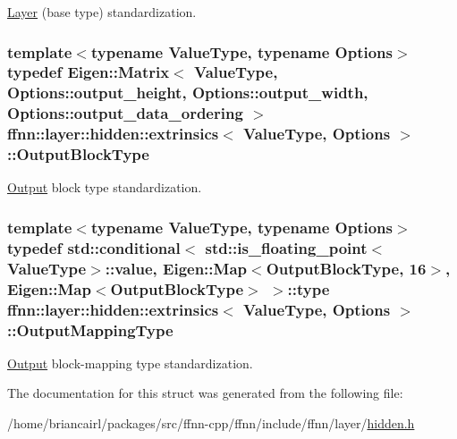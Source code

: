 \hyperlink{classffnn_1_1layer_1_1_layer}{Layer} (base type) standardization. 

\hypertarget{structffnn_1_1layer_1_1hidden_1_1extrinsics_ac5ca721e2e5843ddcf90351b59c4e56e}{
\subsubsection[{Output\-Block\-Type}]{\setlength{\rightskip}{0pt plus 5cm}template$<$typename Value\-Type, typename Options$>$ typedef Eigen\-::\-Matrix$<$ Value\-Type, Options\-::output\-\_\-height, Options\-::output\-\_\-width, Options\-::output\-\_\-data\-\_\-ordering $>$ {\bf ffnn\-::layer\-::hidden\-::extrinsics}$<$ Value\-Type, Options $>$\-::{\bf Output\-Block\-Type}}}\label{structffnn_1_1layer_1_1hidden_1_1extrinsics_ac5ca721e2e5843ddcf90351b59c4e56e}


\hyperlink{classffnn_1_1layer_1_1_output}{Output} block type standardization. 

\hypertarget{structffnn_1_1layer_1_1hidden_1_1extrinsics_a886b2e28314f8641f14407a84af8132c}{
\subsubsection[{Output\-Mapping\-Type}]{\setlength{\rightskip}{0pt plus 5cm}template$<$typename Value\-Type, typename Options$>$ typedef std\-::conditional$<$ std\-::is\-\_\-floating\-\_\-point$<$Value\-Type$>$\-::value, Eigen\-::\-Map$<${\bf Output\-Block\-Type}, 16$>$, Eigen\-::\-Map$<${\bf Output\-Block\-Type}$>$ $>$\-::type {\bf ffnn\-::layer\-::hidden\-::extrinsics}$<$ Value\-Type, Options $>$\-::{\bf Output\-Mapping\-Type}}}\label{structffnn_1_1layer_1_1hidden_1_1extrinsics_a886b2e28314f8641f14407a84af8132c}


\hyperlink{classffnn_1_1layer_1_1_output}{Output} block-\/mapping type standardization. 



The documentation for this struct was generated from the following file\-:\begin{DoxyCompactItemize}
\item 
/home/briancairl/packages/src/ffnn-\/cpp/ffnn/include/ffnn/layer/\hyperlink{hidden_8h}{hidden.\-h}\end{DoxyCompactItemize}
